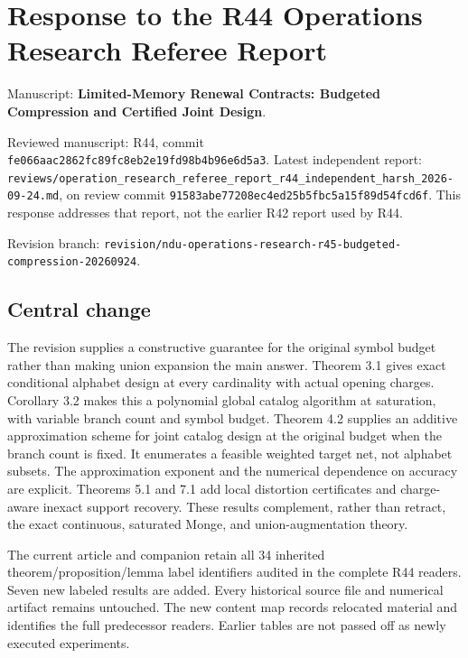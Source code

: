 \documentclass[11pt,letterpaper]{article}
\begin{document}
\section*{Response to the R44 Operations Research Referee Report}


Manuscript: \textbf{Limited-Memory Renewal Contracts: Budgeted Compression and Certified Joint Design}.



Reviewed manuscript: R44, commit \nolinkurl{fe066aac2862fc89fc8eb2e19fd98b4b96e6d5a3}. Latest independent report: \nolinkurl{reviews/operation_research_referee_report_r44_independent_harsh_2026-09-24.md}, on review commit \nolinkurl{91583abe77208ec4ed25b5fbc5a15f89d54fcd6f}. This response addresses that report, not the earlier R42 report used by R44.



Revision branch: \nolinkurl{revision/ndu-operations-research-r45-budgeted-compression-20260924}.



\subsection*{Central change}


The revision supplies a constructive guarantee for the original symbol budget rather than making union expansion the main answer. Theorem 3.1 gives exact conditional alphabet design at every cardinality with actual opening charges. Corollary 3.2 makes this a polynomial global catalog algorithm at saturation, with variable branch count and symbol budget. Theorem 4.2 supplies an additive approximation scheme for joint catalog design at the original budget when the branch count is fixed. It enumerates a feasible weighted target net, not alphabet subsets. The approximation exponent and the numerical dependence on accuracy are explicit. Theorems 5.1 and 7.1 add local distortion certificates and charge-aware inexact support recovery. These results complement, rather than retract, the exact continuous, saturated Monge, and union-augmentation theory.



The current article and companion retain all 34 inherited theorem/proposition/lemma label identifiers audited in the complete R44 readers. Seven new labeled results are added. Every historical source file and numerical artifact remains untouched. The new content map records relocated material and identifies the full predecessor readers. Earlier tables are not passed off as newly executed experiments.
\end{document}
